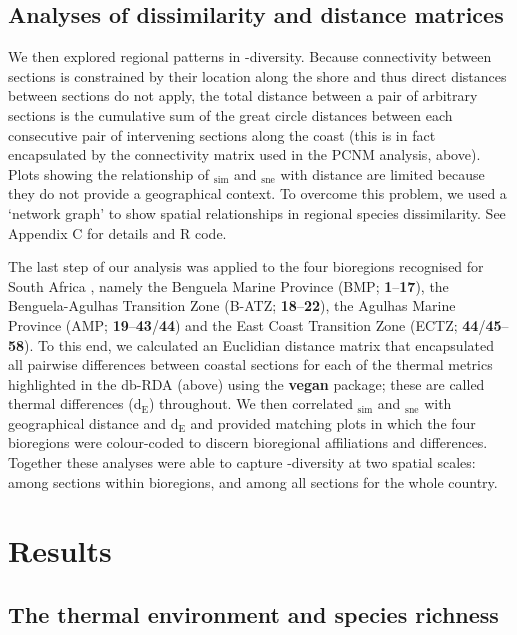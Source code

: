 \documentclass[utf8]{frontiersSCNS} %
\begin{document}
\subsection{Analyses of dissimilarity and distance matrices}

We then explored regional patterns in \textbeta-diversity. Because connectivity between sections is constrained by their location along the shore and thus direct distances between sections do not apply, the total distance between a pair of arbitrary sections is the cumulative sum of the great circle distances between each consecutive pair of intervening sections along the coast (this is in fact encapsulated by the connectivity matrix used in the PCNM analysis, above). Plots showing the relationship of \textbeta$_{\text{sim}}$ and \textbeta$_{\text{sne}}$ with distance are limited because they do not provide a geographical context. To overcome this problem, we used a `network graph' to show spatial relationships in regional species dissimilarity. See Appendix C for details and R code.

The last step of our analysis was applied to the four bioregions recognised for South Africa \citep{Bolton2004}, namely the Benguela Marine Province (BMP; \textbf{1}--\textbf{17}), the Benguela-Agulhas Transition Zone (B-ATZ; \textbf{18}--\textbf{22}), the Agulhas Marine Province (AMP; \textbf{19}--\textbf{43}/\textbf{44}) and the East Coast Transition Zone (ECTZ; \textbf{44}/\textbf{45}--\textbf{58}). To this end, we calculated an Euclidian distance matrix that encapsulated all pairwise differences between coastal sections for each of the thermal metrics highlighted in the db-RDA (above) using the \textbf{vegan} package; these are called thermal differences (d$_{\text{E}}$) throughout. We then correlated  \textbeta$_{\text{sim}}$ and \textbeta$_{\text{sne}}$ with geographical distance and d$_{\text{E}}$ and provided matching plots in which the four bioregions were colour-coded to discern bioregional affiliations and differences. Together these analyses were able to capture \textbeta-diversity at two spatial scales: among sections within bioregions, and among all sections for the whole country.

\section{Results}

\subsection{The thermal environment and species richness}
\end{document}
